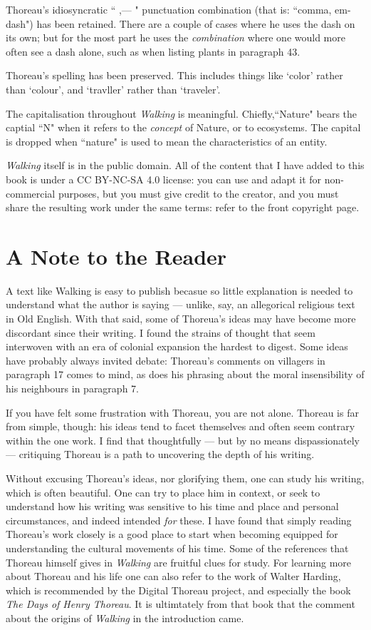 \documentclass[twoside,openright,10pt]{memoir} %
\begin{document}
Thoreau's idiosyncratic “ ,— " punctuation combination (that is: “comma, em-dash") has been retained. There are a couple of cases where he uses the dash on its own; but for the most part he uses the \emph{combination} where one would more often see a dash alone, such as when listing plants in paragraph 43.

Thoreau's spelling has been preserved. This includes things like `color' rather than `colour', and `travller' rather than `traveler'.

The capitalisation throughout \emph{Walking} is meaningful. Chiefly,“Nature" bears the captial “N" when it refers to the \emph{concept} of Nature, or to ecosystems. The capital is dropped when “nature" is used to mean the characteristics of an entity.

\emph{Walking} itself is in the public domain. All of the content that I have added to this book is under a CC BY-NC-SA 4.0 license: you can use and adapt it for non-commercial purposes, but you must give credit to the creator, and you must share the resulting work under the same terms: refer to the front copyright page.

\section*{A Note to the Reader}
A text like Walking is easy to publish becasue so little explanation is needed to understand what the author is saying — unlike, say, an allegorical religious text in Old English. With that said, some of Thoreua's ideas may have become more discordant since their writing. I found the strains of thought that seem interwoven with an era of colonial expansion the hardest to digest. Some ideas have probably always invited debate: Thoreau's comments on villagers in paragraph 17 comes to mind, as does his phrasing about the moral insensibility of his neighbours in paragraph 7.

If you have felt some frustration with Thoreau, you are not alone. Thoreau is far from simple, though: his ideas tend to facet themselves and often seem contrary within the one work. I find that thoughtfully — but by no means dispassionately — critiquing Thoreau is a path to uncovering the depth of his writing.

Without excusing Thoreau's ideas, nor glorifying them, one can study his writing, which is often beautiful. One can try to place him in context, or seek to understand how his writing was sensitive to his time and place and personal circumstances, and indeed intended \emph{for} these. I have found that simply reading Thoreau's work closely is a good place to start when becoming equipped for understanding the cultural movements of his time. Some of the references that Thoreau himself gives in \emph{Walking} are fruitful clues for study. For learning more about Thoreau and his life one can also refer to the work of Walter Harding, which is recommended by the Digital Thoreau project, and especially the book \emph{The Days of Henry Thoreau}. It is ultimtately from that book that the comment about the origins of \emph{Walking} in the introduction came.
\end{document}
